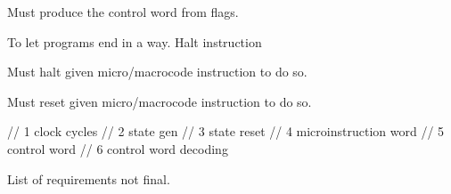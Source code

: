 \begin{turing-requirement}
  Must produce the control word from flags.
\end{turing-requirement}

To let programs end in a way. Halt instruction

\begin{feat-requirement}
  Must halt given micro/macrocode instruction to do so. 
\end{feat-requirement}

\begin{feat-requirement}
  Must reset given micro/macrocode instruction to do so. 
\end{feat-requirement}
// 1 clock cycles
    // 2 state gen
    // 3 state reset
    // 4 microinstruction word
    // 5 control word
    // 6 control word decoding
    
List of requirements not final.


